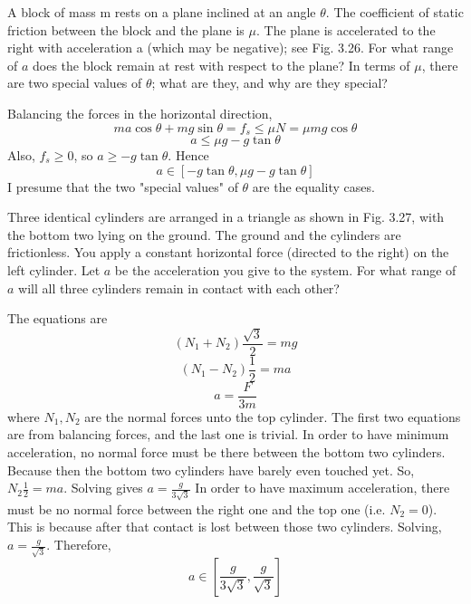 \documentclass[11pt]{scrartcl}
\begin{document}
\begin{example}
  [3.33]
  A block of mass m rests on a plane inclined at an angle $\theta$. The coefficient
  of static friction between the block and the plane is $\mu$. The plane is
  accelerated to the right with acceleration a (which may be negative);
  see Fig. 3.26. For what range of $a$ does the block remain at rest with
  respect to the plane? In terms of $\mu$, there are two special values of $\theta$;
  what are they, and why are they special?
\end{example}
\begin{soln}
  Balancing the forces in the horizontal direction,
  $$ma\cos\theta+mg\sin\theta=f_s\le \mu N=\mu mg\cos\theta$$
  $$a\le \mu g-g\tan\theta$$
  Also, $f_s\ge 0$, so $a\ge -g\tan\theta$. Hence
  $$a\in\left[-g\tan\theta, \mu g-g\tan\theta\right]$$
  I presume that the two "special values" of $\theta$ are the equality cases.
\end{soln}
\begin{example}
  [3.34]
  Three identical cylinders are arranged in a triangle as shown in Fig. 3.27,
  with the bottom two lying on the ground. The ground and the cylinders
  are frictionless. You apply a constant horizontal force (directed to the
  right) on the left cylinder. Let $a$ be the acceleration you give to the
  system. For what range of $a$ will all three cylinders remain in contact
  with each other?
\end{example}
\begin{soln}
  The equations are
  $$(N_1+N_2)\frac{\sqrt{3}}{2}=mg$$
  $$(N_1-N_2)\frac{1}{2}=ma$$
  $$a=\frac{F}{3m}$$
  where $N_1,N_2$ are the normal forces unto the top cylinder.
  The first two equations are from balancing forces, and the last one is trivial.
  In order to have minimum acceleration, no normal force must be there
  between the bottom two cylinders. Because then the bottom two cylinders have barely even touched yet. So, $N_2\frac{1}{2}=ma$. Solving gives
  $a=\frac{g}{3\sqrt{3}}$
  In order to have maximum acceleration, there must be no normal force between
  the right one and the top one (i.e. $N_2=0$). This is because after that
  contact is lost between those two cylinders. Solving, $a=\frac{g}{\sqrt{3}}$.
  Therefore,
  $$a\in \left[\frac{g}{3\sqrt{3}}, \frac{g}{\sqrt{3}}\right]$$
\end{soln}
\begin{example}
  [3.36]
\end{example}
\begin{soln}
\end{soln}
\end{document}
